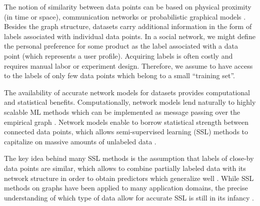 \documentclass[12pt]{report}
\begin{document}
The notion of similarity between data points can be based on physical proximity (in time or space), 
communication networks or probabilistic graphical models \cite{LauritzenGM,BishopBook,koller2009probabilistic}. 
Besides the graph structure, datasets carry additional information in the form of labels associated 
with individual data points. In a social network, we might define the personal preference for some 
product as the label associated with a data point (which represents a user profile). Acquiring labels 
is often costly and requires manual labor or experiment design. Therefore, we assume to have 
access to the labels of only few data points which belong to a small ``training set''. 

The availability of accurate network models for datasets provides computational and statistical benefits. 
Computationally, network models lend naturally to highly scalable ML methods which 
can be implemented as message passing over the empirical graph \cite{DistrOptStatistLearningADMM}. 
Network models enable to borrow statistical strength between connected data points, which allows 
semi-supervised learning (SSL) methods to capitalize on massive amounts of unlabeled data \cite{SemiSupervisedBook}. 

The key idea behind many SSL methods is the assumption that labels of close-by data points are similar, 
which allows to combine partially labeled data with its network structure in order to obtain predictors which generalize 
well \cite{SemiSupervisedBook,belkin2004regularization}. While SSL methods on graphs have been 
applied to many application domains, the precise understanding of which type of data allow for 
accurate SSL is still in its infancy \cite{ijcai2017-450,NSZ09,elalaoui16}. 

\end{document}
